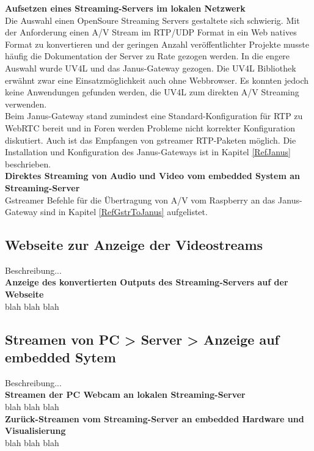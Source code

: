 \textbf{Aufsetzen eines Streaming-Servers im lokalen Netzwerk}\\
Die Auswahl einen OpenSoure Streaming Servers gestaltete sich schwierig. Mit der Anforderung einen A/V Stream im RTP/UDP Format in ein Web natives Format zu konvertieren und der geringen Anzahl veröffentlichter Projekte musste häufig die Dokumentation der Server zu Rate gezogen werden. In die engere Auswahl wurde UV4L und das Janus-Gateway gezogen. Die UV4L Bibliothek erwähnt zwar eine Einsatzmöglichkeit auch ohne Webbrowser. Es konnten jedoch keine Anwendungen gefunden werden, die UV4L zum direkten A/V Streaming verwenden.\\
Beim Janus-Gateway stand zumindest eine Standard-Konfiguration für RTP zu WebRTC bereit und in Foren werden Probleme nicht korrekter Konfiguration diskutiert. Auch ist das Empfangen von gstreamer RTP-Paketen möglich. Die Installation und Konfiguration des Janus-Gateways ist in Kapitel \ref{RefJanus} beschrieben.\\

\textbf{Direktes Streaming von Audio und Video vom embedded System an Streaming-Server}\\
Gstreamer Befehle für die Übertragung von A/V vom Raspberry an das Janus-Gateway sind in Kapitel \ref{RefGstrToJanus} aufgelistet.\\


\subsection{Webseite zur Anzeige der Videostreams}
Beschreibung...\\

\textbf{Anzeige des konvertierten Outputs des Streaming-Servers auf der Webseite}\\
blah blah blah\\

\subsection{Streamen von PC > Server > Anzeige auf embedded Sytem}
Beschreibung...\\

\textbf{Streamen der PC Webcam an lokalen Streaming-Server}\\
blah blah blah\\

\textbf{Zurück-Streamen vom Streaming-Server an embedded Hardware und Visualisierung}\\
blah blah blah\\

